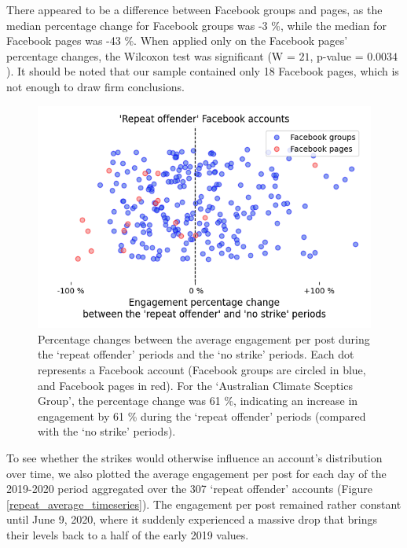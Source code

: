 \documentclass[11pt,a4paper]{article}
\begin{document}
There appeared to be a difference between Facebook groups and pages, as the median percentage change for Facebook groups was -3 \%, while the median for Facebook pages was -43 \%. 
When applied only on the Facebook pages' percentage changes, the Wilcoxon test was significant (W = $21$, p-value = $0.0034$). 
It should be noted that our sample contained only 18 Facebook pages, which is not enough to draw firm conclusions.

\begin{figure}[!h]
\centering
\includegraphics[width=\linewidth]{./../figure/repeat_vs_free_percentage_change.png}
\caption{Percentage changes between the average engagement per post during the `repeat offender' periods and the `no strike' periods. Each dot represents a Facebook account (Facebook groups are circled in blue, and Facebook pages in red). For the `Australian Climate Sceptics Group', the percentage change was 61 \%, indicating an increase in engagement by 61 \% during the `repeat offender' periods (compared with the `no strike' periods).}
\label{repeat_vs_free_percentage_change}
\end{figure}

To see whether the strikes would otherwise influence an account's distribution over time, we also plotted the average engagement per post for each day of the 2019-2020 period aggregated over the 307 `repeat offender' accounts (Figure \ref{repeat_average_timeseries}). 
The engagement per post remained rather constant until June 9, 2020, where it suddenly experienced a massive drop that brings their levels back to a half of the early 2019 values.
\end{document}
